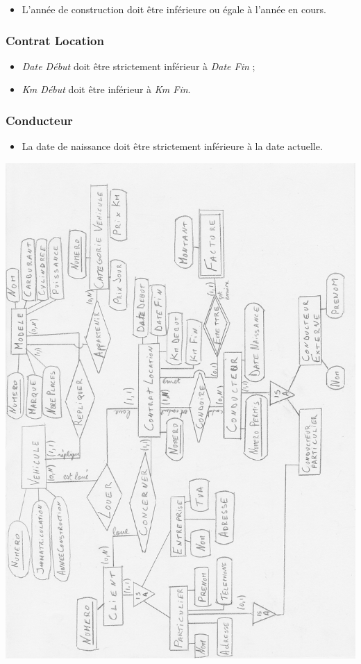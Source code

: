 \documentclass[a4paper]{article}
\newenvironment{changemargin}[2]{%
\begin{list}{}{%
\setlength{\topsep}{0pt}%
\setlength{\leftmargin}{#1}%
\setlength{\rightmargin}{#2}%
\setlength{\listparindent}{\parindent}%
\setlength{\itemindent}{\parindent}%
\setlength{\parsep}{\parskip}%
}%
\item[]}{\end{list}}
\begin{document}
\begin{changemargin}{-1cm}{-1cm}
    \begin{itemize}
        \item L'année de construction doit être inférieure ou égale à l'année
        en cours.
    \end{itemize}

    \subsubsection{Contrat Location}

    \begin{itemize}
        \item \textit{Date Début} doit être strictement inférieur à
        \textit{Date Fin} ;
        \item \textit{Km Début} doit être inférieur à
        \textit{Km Fin}.
    \end{itemize}

    \subsubsection{Conducteur}

    \begin{itemize}
        \item La date de naissance doit être strictement inférieure à la date
        actuelle.
    \end{itemize}

    \includegraphics[width=\textwidth,height=\textheight]{modele.jpg}
    \label{diagramme}


\end{changemargin}
\end{document}
